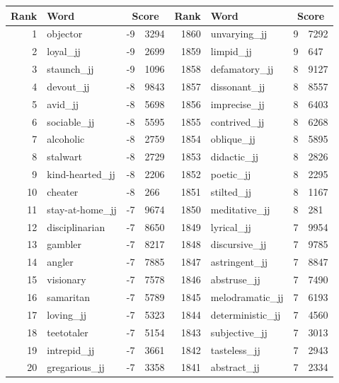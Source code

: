 \begin{table}[tbp]
    \begin{tabular}{| rlr@{.}l | rlr@{.}l |}
    \hline
    \textbf{Rank} & \textbf{Word} & \multicolumn{2}{c|}{\textbf{Score}} & \textbf{Rank} & \textbf{Word} & \multicolumn{2}{c|}{\textbf{Score}} \\
    \hline
    1 & objector & -9 & 3294    &    1860 & unvarying\_jj & 9 & 7292 \\
    2 & loyal\_jj & -9 & 2699    &    1859 & limpid\_jj & 9 & 647 \\
    3 & staunch\_jj & -9 & 1096    &    1858 & defamatory\_jj & 8 & 9127 \\
    4 & devout\_jj & -8 & 9843    &    1857 & dissonant\_jj & 8 & 8557 \\
    5 & avid\_jj & -8 & 5698    &    1856 & imprecise\_jj & 8 & 6403 \\
    6 & sociable\_jj & -8 & 5595    &    1855 & contrived\_jj & 8 & 6268 \\
    7 & alcoholic & -8 & 2759    &    1854 & oblique\_jj & 8 & 5895 \\
    8 & stalwart & -8 & 2729    &    1853 & didactic\_jj & 8 & 2826 \\
    9 & kind-hearted\_jj & -8 & 2206    &    1852 & poetic\_jj & 8 & 2295 \\
    10 & cheater & -8 & 266    &    1851 & stilted\_jj & 8 & 1167 \\
    11 & stay-at-home\_jj & -7 & 9674    &    1850 & meditative\_jj & 8 & 281 \\
    12 & disciplinarian & -7 & 8650    &    1849 & lyrical\_jj & 7 & 9954 \\
    13 & gambler & -7 & 8217    &    1848 & discursive\_jj & 7 & 9785 \\
    14 & angler & -7 & 7885    &    1847 & astringent\_jj & 7 & 8847 \\
    15 & visionary & -7 & 7578    &    1846 & abstruse\_jj & 7 & 7490 \\
    16 & samaritan & -7 & 5789    &    1845 & melodramatic\_jj & 7 & 6193 \\
    17 & loving\_jj & -7 & 5323    &    1844 & deterministic\_jj & 7 & 4560 \\
    18 & teetotaler & -7 & 5154    &    1843 & subjective\_jj & 7 & 3013 \\
    19 & intrepid\_jj & -7 & 3661    &    1842 & tasteless\_jj & 7 & 2943 \\
    20 & gregarious\_jj & -7 & 3358    &    1841 & abstract\_jj & 7 & 2334 \\

\end{tabular}
\end{table}
